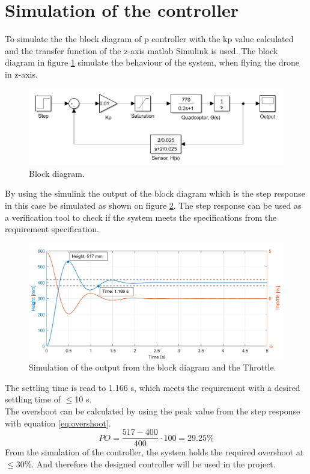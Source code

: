 \section{Simulation of the controller}
 To simulate the the block diagram of p controller with the kp value calculated and the transfer function of the z-axis matlab Simulink is used. The block diagram in figure \ref{fig:Mat_Lab} simulate the behaviour of the system, when flying the drone in z-axis. 
 \begin{figure}[H]
     \centering
     \includegraphics[width=\textwidth]{figures/ch_movement/matlab_block.png}
     \caption{Block diagram.}
     \label{fig:Mat_Lab}
 \end{figure}
By using the simulink the output of the block diagram which is the step response in this case be simulated as shown on figure \ref{fig:simu}. The step response can be used as a verification tool to check if the system meets the specifications from the requirement specification. 
\begin{figure}[H]
    \centering
    \includegraphics[width=1\textwidth]{figures/ch_movement/Simu.png}
    \caption{Simulation of the output from the block diagram and the Throttle.}
    \label{fig:simu}
\end{figure}%
The settling time is read to 1.166 s, which meets the requirement with a desired settling time of $\leq$10 s.\\
The overshoot can be calculated by using the peak value from the step response with equation \ref{eq:overshoot}.
\begin{equation}\label{eq:overshoot}
   PO=\frac{517-400}{400}\cdot 100 = 29.25\%
\end{equation}
From the simulation of the controller, the system holds the required overshoot at $\leq$30\%. And therefore the designed controller will be used in the project.
